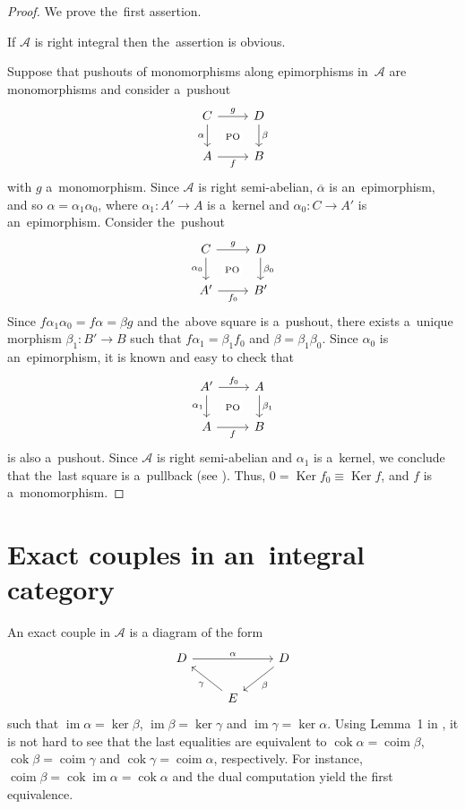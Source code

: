 \documentclass[a4paper,10pt,reqno]{amsart}
\newcommand{\Ker}{\operatorname{Ker}\nolimits}
\newcommand{\cok}{\operatorname{cok}\nolimits}
\newcommand{\im}{\operatorname{im}\nolimits}
\newcommand{\coim}{\operatorname{coim}\nolimits}
\begin{document}
	\begin{proof}
		We prove the~first assertion.
		
		If $\mathcal{A}$ is right integral then the~assertion is obvious.
		
		Suppose that pushouts of monomorphisms along epimorphisms in~$\mathcal{A}$ are monomorphisms and consider a~pushout
		$$
		\begin{tikzcd}
			C \arrow[r, "g"] \arrow[d, "\alpha"'] & D \arrow[d, "\beta"] \\
			A \arrow[r, "f"'] & B
			\arrow[from=1-1, to=2-2, phantom, "\scriptstyle\text{PO}" description]
		\end{tikzcd}
		$$
		with $g$ a~monomorphism. Since $\mathcal{A}$ is right semi-abelian,
		$\overline{\alpha}$ is an~epimorphism, and so $\alpha=\alpha_1 \alpha_0$, where $\alpha_1:A'\to A$ is a~kernel and $\alpha_0:C\to A'$ is an~epimorphism. Consider the~pushout
		$$
		\begin{tikzcd}
			C \arrow[r, "g"] \arrow[d, "\alpha_0"'] & D \arrow[d, "\beta_0"] \\
			A' \arrow[r, "f_0"'] & B'
			\arrow[from=1-1, to=2-2, phantom, "\scriptstyle\text{PO}" description]
		\end{tikzcd}
		$$
		Since $f\alpha_1\alpha_0 = f\alpha = \beta g$ and the~above square
		is a~pushout, there exists a~unique morphism $\beta_1:B'\to B$ such that $f\alpha_1 = \beta_1 f_0$ and $\beta=\beta_1\beta_0$. Since $\alpha_0$ is an~epimorphism, it is known and easy to check that
		$$
		\begin{tikzcd}
			A' \arrow[r, "f_0"] \arrow[d, "\alpha_1"'] & A \arrow[d, "\beta_1"] \\
			A \arrow[r, "f"'] & B
			\arrow[from=1-1, to=2-2, phantom, "\scriptstyle\text{PO}" description]
		\end{tikzcd}
		$$
		is also a~pushout. Since $\mathcal{A}$ is right semi-abelian and $\alpha_1$ is a~kernel, we conclude that the~last square is a~pullback (see \cite[Proposition~3.1]{KW}). Thus, $0=\Ker f_0\equiv \Ker f$, and $f$ is a~monomorphism. 
	\end{proof}
	
	
	\section{Exact couples in an~integral category}\label{ex-couple}
	
	An exact couple in $\mathcal{A}$ is a diagram of the form
	\begin{equation}\label{ex-coup}
		\begin{tikzcd}
			D \arrow[]{rr}{\alpha}& &D \arrow[]{ld}{\beta}\\
			&E \arrow[]{ul}{\gamma}
		\end{tikzcd}
	\end{equation}
	such that $\im\alpha=\ker\beta$, $\im\beta=\ker\gamma$ and $\im\gamma=\ker\alpha$. Using Lemma~1 in \cite{Yak1979}, it is not hard to see that the last equalities are equivalent to $\cok\alpha=\coim\beta$, $\cok\beta=\coim\gamma$ and $\cok\gamma=\coim\alpha$, respectively. For instance, $\coim\beta=\cok\im\alpha=\cok\alpha$ and the dual computation yield the first equivalence.
	
\end{document}

